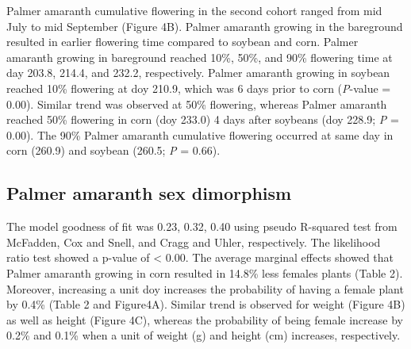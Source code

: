 \documentclass[utf8]{frontiersSCNS}
\begin{document}
Palmer amaranth cumulative flowering in the second cohort ranged from
mid July to mid September (Figure 4B). Palmer amaranth growing in the
bareground resulted in earlier flowering time compared to soybean and
corn. Palmer amaranth growing in bareground reached 10\%, 50\%, and 90\%
flowering time at day 203.8, 214.4, and 232.2, respectively. Palmer
amaranth growing in soybean reached 10\% flowering at doy 210.9, which
was 6 days prior to corn (\emph{P}-value = 0.00). Similar trend was
observed at 50\% flowering, whereas Palmer amaranth reached 50\%
flowering in corn (doy 233.0) 4 days after soybeans (doy 228.9; \emph{P}
= 0.00). The 90\% Palmer amaranth cumulative flowering occurred at same
day in corn (260.9) and soybean (260.5; \emph{P} = 0.66).

\hypertarget{palmer-amaranth-sex-dimorphism}{%
\subsection*{Palmer amaranth sex
dimorphism}\label{palmer-amaranth-sex-dimorphism}}

The model goodness of fit was 0.23, 0.32, 0.40 using pseudo R-squared
test from McFadden, Cox and Snell, and Cragg and Uhler, respectively.
The likelihood ratio test showed a p-value of \textless{} 0.00. The
average marginal effects showed that Palmer amaranth growing in corn
resulted in 14.8\% less females plants (Table 2). Moreover, increasing a
unit doy increases the probability of having a female plant by 0.4\%
(Table 2 and Figure4A). Similar trend is observed for weight (Figure 4B)
as well as height (Figure 4C), whereas the probability of being female
increase by 0.2\% and 0.1\% when a unit of weight (g) and height (cm)
increases, respectively.
\end{document}
